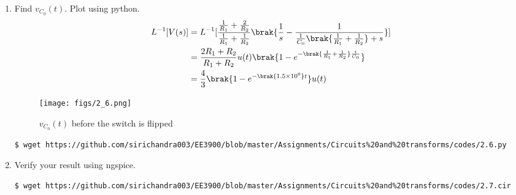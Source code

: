 \documentclass[journal,12pt,twocolumn]{IEEEtran}
\renewcommand\thesection{\arabic{section}}
\begin{document}
\begin{enumerate}[label=\arabic*.,ref=\thesection.\theenumi]
\item Find $v_{C_0}(t)$.  Plot using python. \\
\solution
\begin{align}
L^{-1}[V(s)]&=L^{-1}[\frac{\frac{1}{R_1} + \frac{2}{R_2}}{\frac{1}{R_1} + \frac{1}{R_2}}\brak{\frac{1}{s} - \frac{1}{\frac{1}{C_0}\brak{\frac{1}{R_1} + \frac{1}{R_2}} + s}}] \\
&=\frac{2R_1 + R_2}{R_1 + R_2}u(t)\brak{1 - e^{-\brak{\frac{1}{R_1} + \frac{1}{R_2}}\frac{t}{C_0}}} \\
&=\frac{4}{3}\brak{1 - e^{-\brak{1.5 \times 10^6}t}}u(t)
\end{align}
\begin{figure}[!ht]
\centering
\texttt{[image: figs/2\_6.png]}
\caption{$v_{C_0}(t)$ before the switch is flipped}
\label{fig:v1-t}
\end{figure}
\begin{lstlisting}
$ wget https://github.com/sirichandra003/EE3900/blob/master/Assignments/Circuits%20and%20transforms/codes/2.6.py
\end{lstlisting}
\item Verify your result using ngspice.
\solution
\begin{lstlisting}
$ wget https://github.com/sirichandra003/EE3900/blob/master/Assignments/Circuits%20and%20transforms/codes/2.7.cir
\end{lstlisting}
\end{enumerate}
\end{document}
